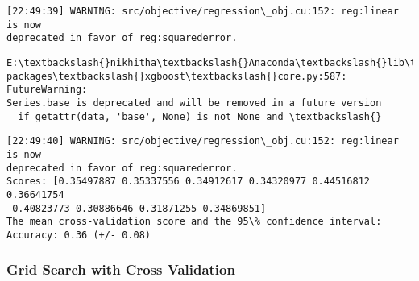 \documentclass[11pt]{article}
\begin{document}
    \begin{Verbatim}[commandchars=\\\{\}]
[22:49:39] WARNING: src/objective/regression\_obj.cu:152: reg:linear is now
deprecated in favor of reg:squarederror.
    \end{Verbatim}

    \begin{Verbatim}[commandchars=\\\{\}]
E:\textbackslash{}nikhitha\textbackslash{}Anaconda\textbackslash{}lib\textbackslash{}site-packages\textbackslash{}xgboost\textbackslash{}core.py:587: FutureWarning:
Series.base is deprecated and will be removed in a future version
  if getattr(data, 'base', None) is not None and \textbackslash{}
    \end{Verbatim}

    \begin{Verbatim}[commandchars=\\\{\}]
[22:49:40] WARNING: src/objective/regression\_obj.cu:152: reg:linear is now
deprecated in favor of reg:squarederror.
Scores: [0.35497887 0.35337556 0.34912617 0.34320977 0.44516812 0.36641754
 0.40823773 0.30886646 0.31871255 0.34869851]
The mean cross-validation score and the 95\% confidence interval:
Accuracy: 0.36 (+/- 0.08)
    \end{Verbatim}

    \hypertarget{grid-search-with-cross-validation}{%
\subsubsection{Grid Search with Cross
Validation}\label{grid-search-with-cross-validation}}
\end{document}
